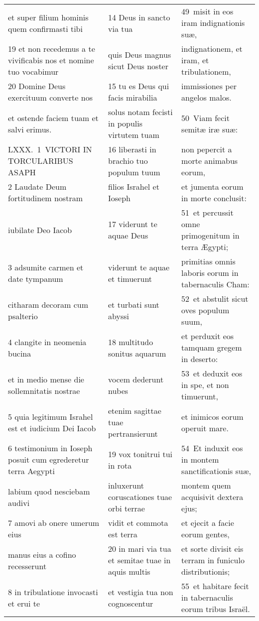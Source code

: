 \documentclass{article}
\begin{document}
\begin{longtable}{@{}p{}p{}p{}@{}}
et super filium hominis quem confirmasti tibi	&	14 Deus in sancto via tua	&	49 misit in eos iram indignationis suæ,	\\
19 et non recedemus a te vivificabis nos et nomine tuo vocabimur	&	quis Deus magnus sicut Deus noster	&	indignationem, et iram, et tribulationem,	\\
20 Domine Deus exercituum converte nos	&	15 tu es Deus qui facis mirabilia	&	immissiones per angelos malos.	\\
et ostende faciem tuam et salvi erimus.	&	solus notam fecisti in populis virtutem tuam	&	50 Viam fecit semitæ iræ suæ:	\\
LXXX. 1 VICTORI IN TORCULARIBUS ASAPH	&	16 liberasti in brachio tuo populum tuum	&	non pepercit a morte animabus eorum,	\\
2 Laudate Deum fortitudinem nostram	&	filios Israhel et Ioseph	&	et jumenta eorum in morte conclusit:	\\
iubilate Deo Iacob	&	17 viderunt te aquae Deus	&	51 et percussit omne primogenitum in terra Ægypti;	\\
3 adsumite carmen et date tympanum	&	viderunt te aquae et timuerunt	&	primitias omnis laboris eorum in tabernaculis Cham:	\\
citharam decoram cum psalterio	&	et turbati sunt abyssi	&	52 et abstulit sicut oves populum suum,	\\
4 clangite in neomenia bucina	&	18 multitudo sonitus aquarum	&	et perduxit eos tamquam gregem in deserto:	\\
et in medio mense die sollemnitatis nostrae	&	vocem dederunt nubes	&	53 et deduxit eos in spe, et non timuerunt,	\\
5 quia legitimum Israhel est et iudicium Dei Iacob	&	etenim sagittae tuae pertransierunt	&	et inimicos eorum operuit mare.	\\
6 testimonium in Ioseph posuit cum egrederetur terra Aegypti	&	19 vox tonitrui tui in rota	&	54 Et induxit eos in montem sanctificationis suæ,	\\
labium quod nesciebam audivi	&	inluxerunt coruscationes tuae orbi terrae	&	montem quem acquisivit dextera ejus;	\\
7 amovi ab onere umerum eius	&	vidit et commota est terra	&	et ejecit a facie eorum gentes,	\\
manus eius a cofino recesserunt	&	20 in mari via tua et semitae tuae in aquis multis	&	et sorte divisit eis terram in funiculo distributionis;	\\
8 in tribulatione invocasti et erui te	&	et vestigia tua non cognoscentur	&	55 et habitare fecit in tabernaculis eorum tribus Israël.	\\

\end{longtable}
\end{document}

